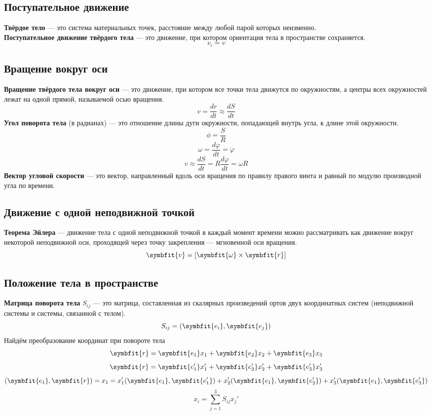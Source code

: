 \documentclass[fleqn,a4paper,12pt,titlepage,finall]{article}
\newcommand\vv[1]{\symbfit{#1}}
\begin{document}
\subsection{Поступательное движение}
{\bf Твёрдое тело} --- это система материальных точек, расстояние между любой
парой которых неизменно. \\
{\bf Поступательное движение твёрдого тела} --- это движение, при котором
ориентация тела в пространстве сохраняется. \\
\[v_i = v\]
\subsection{Вращение вокруг оси}
{\bf Вращение твёрдого тела вокруг оси} --- это движение, при котором все точки
тела движутся по окружностям, а центры всех окружностей лежат на одной прямой,
называемой осью вращения. \\
\[v = \frac{dr}{dt} \approx \frac{dS}{dt}\]
{\bf Угол поворота тела} (в радианах) --- это отношение длины дуги окружности,
попадающей внутрь угла, к длине этой окружности.
\[\phi = \frac{S}{R}\]
\[\omega = \frac{d\varphi}{dt} = \dot{\varphi}\]
\[v \approx \frac{dS}{dt} = R\frac{d\varphi}{dt} = \omega R\]
{\bf Вектор угловой скорости} --- это вектор, направленный вдоль оси вращения по
правилу правого винта и равный по модулю производной угла по времени. \\
\subsection{Движение с одной неподвижной точкой}
{\bf Теорема Эйлера} --- движение тела с одной неподвижной точкой в каждый
момент времени можно рассматривать как движение вокруг некоторой неподвижной
оси, проходящей через точку закрепления --- мгновенной оси вращения.
\[\vv{v} = [\vv{\omega} \times \vv{r}]\]
\subsection{Положение тела в пространстве}
{\bf Матрица поворота тела} $S_{ij}$ --- это матрица, составленная из скалярных
произведений ортов двух координатных систем (неподвижной системы и системы,
связанной с телом).
\[S_{ij} = \left(\vv{e_i}, \vv{e_j}\right)\]
Найдём преобразование координат при повороте тела
\[\vv{r} = \vv{e_1}x_1 + \vv{e_2}x_2 + \vv{e_3}x_3\]
\[\vv{r} = \vv{e_1'}x_1' + \vv{e_2'}x_2' + \vv{e_3'}x_3'\]
\[(\vv{e_1}, \vv{r}) = x_1 = x_1'(\vv{e_1}, \vv{e_1'}) + x_2'(\vv{e_1},
\vv{e_2'}) + x_3'(\vv{e_1}, \vv{e_3'})\]
\[\boxed{x_i = \sum_{j=1}^3 S_{ij}x_j'}\]
\end{document}
